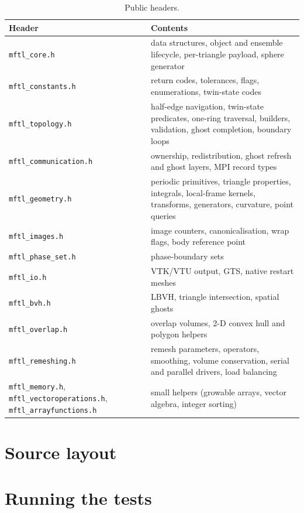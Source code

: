 \begin{table}[ht]
\centering\small
\begin{tabularx}{\textwidth}{@{}lX@{}}
\toprule
Header & Contents \\
\midrule
\texttt{mftl\_core.h} & data structures, object and ensemble lifecycle, per-triangle payload, sphere generator \\
\texttt{mftl\_constants.h} & return codes, tolerances, flags, enumerations, twin-state codes \\
\texttt{mftl\_topology.h} & half-edge navigation, twin-state predicates, one-ring traversal, builders, validation, ghost completion, boundary loops \\
\texttt{mftl\_communication.h} & ownership, redistribution, ghost refresh and ghost layers, MPI record types \\
\texttt{mftl\_geometry.h} & periodic primitives, triangle properties, integrals, local-frame kernels, transforms, generators, curvature, point queries \\
\texttt{mftl\_images.h} & image counters, canonicalisation, wrap flags, body reference point \\
\texttt{mftl\_phase\_set.h} & phase-boundary sets \\
\texttt{mftl\_io.h} & VTK/VTU output, GTS, native restart meshes \\
\texttt{mftl\_bvh.h} & LBVH, triangle intersection, spatial ghosts \\
\texttt{mftl\_overlap.h} & overlap volumes, 2-D convex hull and polygon helpers \\
\texttt{mftl\_remeshing.h} & remesh parameters, operators, smoothing, volume conservation, serial and parallel drivers, load balancing \\
\texttt{mftl\_memory.h}, \texttt{mftl\_vectoroperations.h}, \texttt{mftl\_arrayfunctions.h} & small helpers (growable arrays, vector algebra, integer sorting) \\
\bottomrule
\end{tabularx}
\caption{Public headers.}
\label{tab:headers}
\end{table}

\section{Source layout}
\label{sec:layout}



\section{Running the tests}

